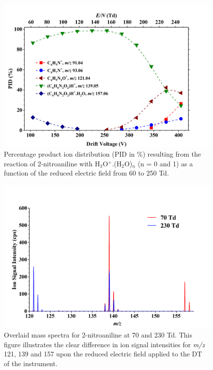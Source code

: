 
\begin{figure}%
\centering
\includegraphics[height=0.35\textheight]{pics/nitros_paper_3.png}
\caption{Percentage product ion distribution (PID in \%) resulting from the reaction of 2-nitroaniline with H$_3$O$^+$.(H$_2$O)$_n$ (n = 0 and 1) as a function of the reduced electric field from 60 to 250 Td.}
\label{fig:na_fig3}
\end{figure}




\begin{figure}%
\centering
\includegraphics[height=0.35\textheight]{pics/nitros_paper_spec.png}
\caption{Overlaid mass spectra for 2-nitroaniline at 70 and 230 Td. This figure illustrates the clear difference in ion signal intensities for \textit{m/z} 121, 139 and 157 upon the reduced electric field applied to the DT of the instrument.}
\label{fig:na_spec}
\end{figure}


